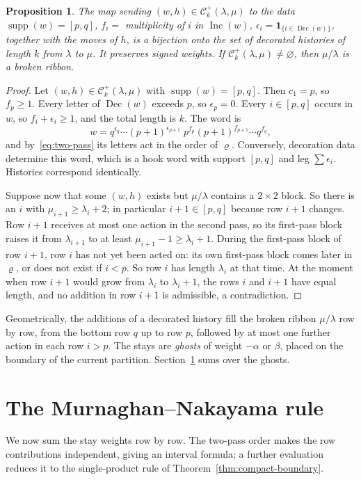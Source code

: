 \documentclass[11pt]{amsart}
\numberwithin{equation}{section}
\newtheorem{proposition}[theorem]{Proposition}
\theoremstyle{definition}
\theoremstyle{remark}
\newcommand{\supp}{\operatorname{supp}}
\newcommand{\Inc}{\operatorname{Inc}}
\newcommand{\Dec}{\operatorname{Dec}}
\newcommand{\ind}{\mathbf 1}
\newcommand{\cC}{\mathcal C}
\begin{document}
\begin{proposition}\label{prop:broken-ribbon}
The map sending $(w,h)\in\cC^+_k(\lambda,\mu)$ to the data
$\supp(w)=[p,q]$, $f_i=$ multiplicity of $i$ in $\Inc(w)$,
$\epsilon_i=\ind_{\{i\in\Dec(w)\}}$, together with the moves of $h$, is a
bijection onto the set of decorated histories of length $k$ from $\lambda$ to
$\mu$. It preserves signed weights. If $\cC^+_k(\lambda,\mu)\neq\varnothing$,
then $\mu/\lambda$ is a broken ribbon.
\end{proposition}

\begin{proof}
Let $(w,h)\in\cC^+_k(\lambda,\mu)$ with $\supp(w)=[p,q]$. Then $c_1=p$, so
$f_p\geq1$. Every letter of $\Dec(w)$ exceeds $p$, so $\epsilon_p=0$. Every
$i\in[p,q]$ occurs in $w$, so $f_i+\epsilon_i\geq1$, and the total length is
$k$. The word is
\[
 w=q^{\epsilon_q}\cdots(p+1)^{\epsilon_{p+1}}\;p^{f_p}(p+1)^{f_{p+1}}\cdots q^{f_q},
\]
and by~\eqref{eq:two-pass} its letters act in the order of $\varrho$.
Conversely, decoration data determine this word, which is a hook word with
support $[p,q]$ and leg $\sum\epsilon_i$. Histories correspond identically.

Suppose now that some $(w,h)$ exists but $\mu/\lambda$ contains a $2\times2$
block. So there is an $i$ with
$\mu_{i+1}\geq\lambda_i+2$; in particular $i+1\in[p,q]$ because row $i+1$
changes. Row $i+1$ receives at most one action in the second pass, so its
first-pass block raises it from $\lambda_{i+1}$ to at least
$\mu_{i+1}-1\geq\lambda_i+1$. During the first-pass block of row $i+1$, row
$i$ has not yet been acted on: its own first-pass block comes later in
$\varrho$, or does not exist if $i<p$. So row $i$ has length $\lambda_i$ at
that time. At the moment when row $i+1$ would grow from $\lambda_i$ to
$\lambda_i+1$, the rows $i$ and $i+1$ have equal length, and no addition in
row $i+1$ is admissible, a contradiction.
\end{proof}

Geometrically, the additions of a decorated history fill the broken ribbon
$\mu/\lambda$ row by row, from the bottom row $q$ up to row $p$, followed by
at most one further action in each row $i>p$. The stays are \emph{ghosts}
of weight $-\alpha$ or $\beta$, placed on the boundary of the current
partition. Section~\ref{sec:boundary} sums over the ghosts.

\section{The Murnaghan--Nakayama rule}\label{sec:boundary}
We now sum the stay weights row by row. The two-pass order makes the
row contributions independent, giving an interval formula; a further
evaluation reduces it to the single-product rule of
Theorem~\ref{thm:compact-boundary}.
\end{document}

